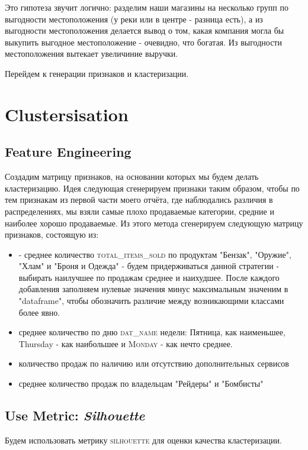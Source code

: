 \documentclass[%
10pt, %
final, %
oneside, %
onecolumn, %
centertags]{article} %
\theoremstyle{plain}
\theoremstyle{definition}
\theoremstyle{remark}
\begin{document}
Это гипотеза звучит логично: разделим наши магазины на несколько групп по выгодности местоположения (у реки или в центре - разница есть), а из выгодности местоположения делается вывод о том, какая компания могла бы выкупить выгодное местоположение - очевидно, что богатая. Из выгодности местоположения вытекает увеличиние выручки.

Перейдем к генерации признаков и кластеризации.

\newpage
\section{Clustersisation}

\subsection{Feature Engineering}

Создадим матрицу признаков, на основании которых мы будем делать кластеризацию. Идея следующая сгенерируем признаки таким образом, чтобы по тем признакам из первой части моего отчёта, где наблюдались различия в распределениях, мы взяли самые плохо продаваемые категории, средние и наиболее хорошо продаваемые. Из этого метода сгенерируем следующую матрицу признаков, состоящую из:
\begin{itemize}
	\item - среднее количество \textsc{total\_items\_sold} по продуктам "Бензак", "Оружие", "Хлам" и "Броня и Одежда" - будем придерживаться данной стратегии - выбирать наилучшее по продажам среднее и наихудшее. После каждого добавления заполняем нулевые значения минус максимальным значеним в "dataframe", чтобы обозначить различие между возникающими классами более явно.
	\item среднее количество по дню \textsc{dat\_name} недели: Пятница, как наименьшее, Thursday - как наибольшее и \textsc{Monday} - как нечто среднее.
	\item количество продаж по наличию или отсутствию дополнительных сервисов
	\item среднее количество продаж по владельцам "Рейдеры" и "Бомбисты"
\end{itemize}

\subsection{Use Metric: \textit{Silhouette}}

Будем использовать метрику \textsc{silhouette} для оценки качества кластеризации.
\end{document}
